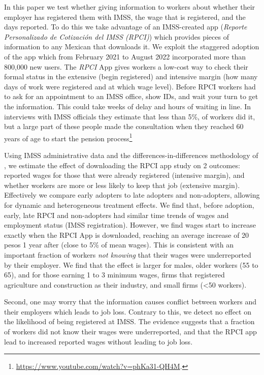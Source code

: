 \documentclass[oneside,11pt]{article}
\begin{document}
In this paper we test whether giving information to workers about whether their employer has registered them with IMSS, the wage that is registered, and the days reported. To do this we take advantage of an IMSS-created app (\textit{Reporte Personalizado de Cotización del IMSS (RPCI)}) which provides  pieces of information to any Mexican that downloads it. We exploit the staggered adoption of the app which from February 2021 to August 2022 incorporated more than 800,000 new users. The \textit{RPCI} App gives workers a low-cost way to check their formal status in the extensive (begin registered) and intensive margin (how many days of work were registered and at which wage level). Before RPCI workers had to ask for an appointment to an IMSS office, show IDs, and wait your turn to get the information. This could take weeks of delay and hours of waiting in line. In interviews with IMSS officials they estimate that less than 5\%, of workers did it, but a large part of these people made the consultation when they reached 60 years of age to start the pension process\footnote{\url{https://www.youtube.com/watch?v=phKa31-QH4M}.}

Using IMSS administrative data and the differences-in-differences methodology of \cite{deChaisemartin2022}, we estimate the effect of downloading the RPCI app study on 2 outcomes: reported wages for those that were already registered (intensive margin), and whether workers are more or less likely to keep that job (extensive margin). Effectively we compare early adopters to late adopters and non-adopters, allowing for dynamic and heterogeneous treatment effects. We find that, before adoption, early, late RPCI and non-adopters had similar time trends of wages and employment status (IMSS registration). However, we find wages start to increase exactly when the RPCI App is downloaded, reaching an average increase of 20 pesos 1 year after (close to 5\% of mean wages). This is consistent with an important fraction of workers \textit{not knowing} that their wages were underreported by their employer. We find that the effect is larger for males, older workers (55 to 65), and for those earning 1 to 3 minimum wages, firms that registered agriculture and construction as their industry, and small firms (<50 workers).

Second, one may worry that the information causes conflict between workers and their employers which leads to job loss. Contrary to this, we detect no effect on the likelihood of being registered at IMSS.  %
The evidence suggests that a fraction of workers did not know their wages were underreported, and that the RPCI app lead to increased reported wages without leading to job loss. 
\end{document}
